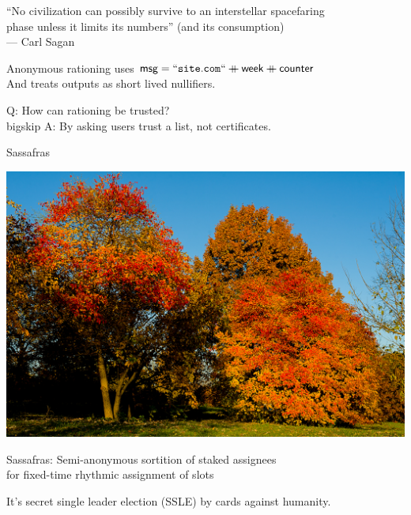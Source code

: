 \documentclass{beamer}
\begin{document}
\begin{frame}

``No civilization can possibly survive to an interstellar spacefaring \\ \smallskip
\hspace{1pt} phase unless it limits its numbers'' (and its consumption) \\ \medskip
--- Carl Sagan

\pause\bigskip\bigskip 

Anonymous rationing uses $\mathsf{msg} = \mathtt{``site.com``} \mathbin{+\mkern-10mu+} \mathsf{week} \mathbin{+\mkern-10mu+} \mathsf{counter}$ \\
\hspace{1pt} And treats outputs as short lived nullifiers.

\pause\bigskip\bigskip 

Q: How can rationing be trusted? \\ bigskip
A: By asking users trust a list, not certificates.


\end{frame}



\begin{frame}{Sassafras}

\includegraphics[width=\textwidth]{Sassafras-albidum.jpg}

\end{frame}



\begin{frame}

Sassafras: Semi-anonymous sortition of staked assignees \\
\hspace{5pt} for fixed-time rhythmic assignment of slots

\pause\bigskip\bigskip

It's secret single leader election (SSLE) by cards against humanity.

\end{frame}
\end{document}
